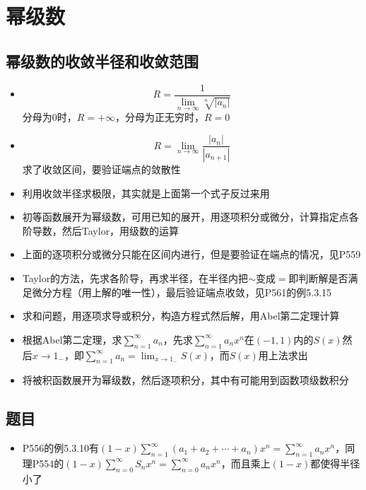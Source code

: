 \documentclass[UTF8]{ctexart}
\begin{document}
\section{幂级数}
\subsection{幂级数的收敛半径和收敛范围}
\begin{itemize}
\item
\[
R=\frac{1}{\lim_{n \to \infty}\sqrt[n]{|a_n|}}
\]
分母为0时，$R=+\infty$，分母为正无穷时，$R=0$
\item
\[
R=\lim_{n\to \infty}\frac{|a_n|}{|a_{n+1}|}
\]
求了收敛区间，要验证端点的敛散性
\item 利用收敛半径求极限，其实就是上面第一个式子反过来用

\item 初等函数展开为幂级数，可用已知的展开，用逐项积分或微分，计算指定点各阶导数，然后Taylor，用级数的运算

\item 上面的逐项积分或微分只能在区间内进行，但是要验证在端点的情况，见P559

\item Taylor的方法，先求各阶导，再求半径，在半径内把$\sim$变成$=$即判断解是否满足微分方程（用上解的唯一性），最后验证端点收敛，见P561的例5.3.15

\item 求和问题，用逐项求导或积分，构造方程式然后解，用Abel第二定理计算

\item 根据Abel第二定理，求$\sum_{n=1}^\infty a_n$，先求$\sum_{n=1}^\infty a_nx^n$在$(-1,1)$内的$S(x)$然后$x\to 1_-$，即$\sum_{n=1}^\infty a_n=\lim_{x\to 1_-}S(x)$，而$S(x)$用上法求出

\item 将被积函数展开为幂级数，然后逐项积分，其中有可能用到函数项级数积分

\end{itemize}

\subsection{题目}
\begin{itemize}
\item P556的例5.3.10有$(1-x)\sum_{n=1}^\infty(a_1+a_2+\cdots+a_n)x^n=\sum_{n=1}^\infty a_nx^n$，同理P554的$(1-x)\sum_{n=0}^\infty S_nx^n=\sum_{n=0}^\infty a_nx^n$，而且乘上$(1-x)$都使得半径小了

\end{itemize}
\end{document}
